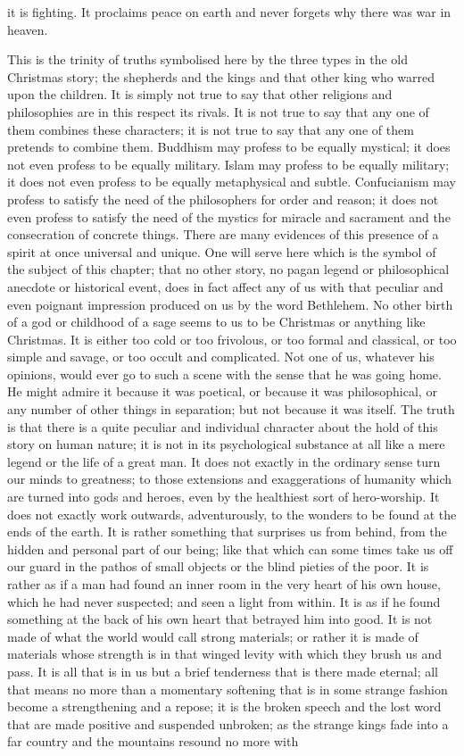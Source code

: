 it is fighting. It proclaims peace on earth and never forgets why there was war in heaven.

This is the trinity of truths symbolised here by the three types in the old Christmas story; the shepherds and the kings and that other king who warred upon the children. It is simply not true to say that other religions and philosophies are in this respect its rivals. It is not true to say that any one of them combines these characters; it is not true to say that any one of them pretends to combine them. Buddhism may profess to be equally mystical; it does not even profess to be equally military. Islam may profess to be equally military; it does not even profess to be equally metaphysical and subtle. Confucianism may profess to satisfy the need of the philosophers for order and reason; it does not even profess to satisfy the need of the mystics for miracle and sacrament and the consecration of concrete things. There are many evidences of this presence of a spirit at once universal and unique. One will serve here which is the symbol of the subject of this chapter; that no other story, no pagan legend or philosophical anecdote or historical event, does in fact affect any of us with that peculiar and even poignant impression produced on us by the word Bethlehem. No other birth of a god or childhood of a sage seems to us to be Christmas or anything like Christmas. It is either too cold or too frivolous, or too formal and classical, or too simple and savage, or too occult and complicated. Not one of us, whatever his opinions, would ever go to such a scene with the sense that he was going home. He might admire it because it was poetical, or because it was philosophical, or any number of other things in separation; but not because it was itself. The truth is that there is a quite peculiar and individual character about the hold of this story on human nature; it is not in its psychological substance at all like a mere legend or the life of a great man. It does not exactly in the ordinary sense turn our minds to greatness; to those extensions and exaggerations of humanity which are turned into gods and heroes, even by the healthiest sort of hero-worship. It does not exactly work outwards, adventurously, to the wonders to be found at the ends of the earth. It is rather something that surprises us from behind, from the hidden and personal part of our being; like that which can some times take us off our guard in the pathos of small objects or the blind pieties of the poor. It is rather as if a man had found an inner room in the very heart of his own house, which he had never suspected; and seen a light from within. It is as if he found something at the back of his own heart that betrayed him into good. It is not made of what the world would call strong materials; or rather it is made of materials whose strength is in that winged levity with which they brush us and pass. It is all that is in us but a brief tenderness that is there made eternal; all that means no more than a momentary softening that is in some strange fashion become a strengthening and a repose; it is the broken speech and the lost word that are made positive and suspended unbroken; as the strange kings fade into a far country and the mountains resound no more with 